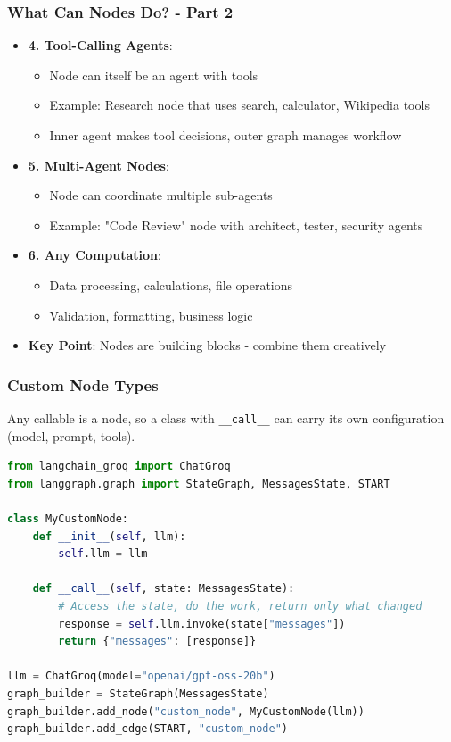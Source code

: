 \begin{frame}[fragile]\frametitle{What Can Nodes Do? - Part 2}
      \begin{itemize}
        \item \textbf{4. Tool-Calling Agents}:
        \begin{itemize}
            \item Node can itself be an agent with tools
            \item Example: Research node that uses search, calculator, Wikipedia tools
            \item Inner agent makes tool decisions, outer graph manages workflow
        \end{itemize}
        \item \textbf{5. Multi-Agent Nodes}:
        \begin{itemize}
            \item Node can coordinate multiple sub-agents
            \item Example: "Code Review" node with architect, tester, security agents
        \end{itemize}
        \item \textbf{6. Any Computation}:
        \begin{itemize}
            \item Data processing, calculations, file operations
            \item Validation, formatting, business logic
        \end{itemize}
        \item \textbf{Key Point}: Nodes are building blocks - combine them creatively
      \end{itemize}
\end{frame}
\begin{frame}[fragile]\frametitle{Custom Node Types}

Any callable is a node, so a class with \texttt{\_\_call\_\_} can carry its own configuration (model, prompt, tools).

      \begin{lstlisting}[language=Python]
from langchain_groq import ChatGroq
from langgraph.graph import StateGraph, MessagesState, START

class MyCustomNode:
    def __init__(self, llm):
        self.llm = llm

    def __call__(self, state: MessagesState):
        # Access the state, do the work, return only what changed
        response = self.llm.invoke(state["messages"])
        return {"messages": [response]}

llm = ChatGroq(model="openai/gpt-oss-20b")
graph_builder = StateGraph(MessagesState)
graph_builder.add_node("custom_node", MyCustomNode(llm))
graph_builder.add_edge(START, "custom_node")
      \end{lstlisting}
\end{frame}
